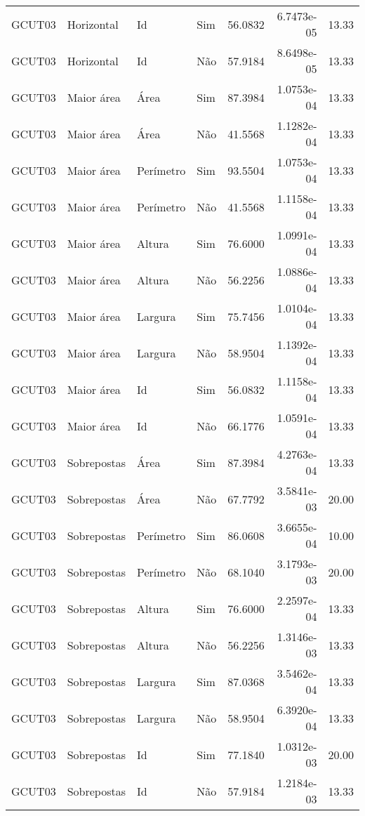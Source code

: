 \begin{tabular}{llllrrr}
    GCUT03    & Horizontal  & Id        & Sim         & 56.0832      & 6.7473e-05 & 13.33    \\
    GCUT03    & Horizontal  & Id        & Não         & 57.9184      & 8.6498e-05 & 13.33    \\
    GCUT03    & Maior área  & Área      & Sim         & 87.3984      & 1.0753e-04 & 13.33    \\
    GCUT03    & Maior área  & Área      & Não         & 41.5568      & 1.1282e-04 & 13.33    \\
    GCUT03    & Maior área  & Perímetro & Sim         & 93.5504      & 1.0753e-04 & 13.33    \\
    GCUT03    & Maior área  & Perímetro & Não         & 41.5568      & 1.1158e-04 & 13.33    \\
    GCUT03    & Maior área  & Altura    & Sim         & 76.6000      & 1.0991e-04 & 13.33    \\
    GCUT03    & Maior área  & Altura    & Não         & 56.2256      & 1.0886e-04 & 13.33    \\
    GCUT03    & Maior área  & Largura   & Sim         & 75.7456      & 1.0104e-04 & 13.33    \\
    GCUT03    & Maior área  & Largura   & Não         & 58.9504      & 1.1392e-04 & 13.33    \\
    GCUT03    & Maior área  & Id        & Sim         & 56.0832      & 1.1158e-04 & 13.33    \\
    GCUT03    & Maior área  & Id        & Não         & 66.1776      & 1.0591e-04 & 13.33    \\
    GCUT03    & Sobrepostas & Área      & Sim         & 87.3984      & 4.2763e-04 & 13.33    \\
    GCUT03    & Sobrepostas & Área      & Não         & 67.7792      & 3.5841e-03 & 20.00    \\
    GCUT03    & Sobrepostas & Perímetro & Sim         & 86.0608      & 3.6655e-04 & 10.00    \\
    GCUT03    & Sobrepostas & Perímetro & Não         & 68.1040      & 3.1793e-03 & 20.00    \\
    GCUT03    & Sobrepostas & Altura    & Sim         & 76.6000      & 2.2597e-04 & 13.33    \\
    GCUT03    & Sobrepostas & Altura    & Não         & 56.2256      & 1.3146e-03 & 13.33    \\
    GCUT03    & Sobrepostas & Largura   & Sim         & 87.0368      & 3.5462e-04 & 13.33    \\
    GCUT03    & Sobrepostas & Largura   & Não         & 58.9504      & 6.3920e-04 & 13.33    \\
    GCUT03    & Sobrepostas & Id        & Sim         & 77.1840      & 1.0312e-03 & 20.00    \\
    GCUT03    & Sobrepostas & Id        & Não         & 57.9184      & 1.2184e-03 & 13.33    \\
    \hline
\end{tabular}